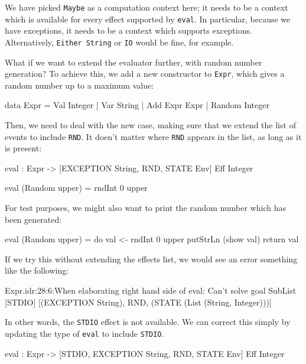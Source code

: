 We have picked \texttt{Maybe} as a computation context here; it needs to
be a context which is available for every effect supported by \texttt{eval}.
In particular, because we have exceptions, it needs to be a context which
supports exceptions. Alternatively, \texttt{Either String} or \texttt{IO}
would be fine, for example.

What if we want to extend the evaluator further, with random number generation?
To achieve this, we add a new constructor to \texttt{Expr}, which gives
a random number up to a maximum value:

\begin{code}
data Expr = Val Integer
          | Var String
          | Add Expr Expr
          | Random Integer
\end{code}

\noindent
Then, we need to deal with the new case, making sure that we extend the
list of events to include \texttt{RND}. It doen't matter where \texttt{RND}
appears in the list, as long as it is present:

\begin{code}
eval : Expr -> { [EXCEPTION String, RND, STATE Env] } Eff Integer

eval (Random upper) = rndInt 0 upper
\end{code}

\noindent
For test purposes, we might also want to print the random number which has
been generated:

\begin{code}
eval (Random upper) = do val <- rndInt 0 upper
                         putStrLn (show val)
                         return val
\end{code}

\noindent
If we try this without extending the effects list, we would see an error
something like the following:

\begin{code}
Expr.idr:28:6:When elaborating right hand side of eval:
Can't solve goal 
   SubList [STDIO]
           [(EXCEPTION String), RND, (STATE (List (String, Integer)))]
\end{code}

\noindent
In other words, the \texttt{STDIO} effect is not available. We can correct
this simply by updating the type of \texttt{eval} to include \texttt{STDIO}.

\begin{code}
eval : Expr -> { [STDIO, EXCEPTION String, RND, STATE Env] } Eff Integer
\end{code}

